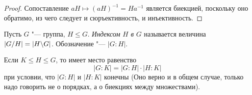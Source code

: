 \begin{proof}
	Сопоставление $aH \mapsto (aH)^{-1} = Ha^{-1}$ является биекцией, поскольку оно обратимо, из чего следует и сюръективность, и инъективность.
\end{proof}

\begin{definition}
	Пусть $G$ "--- группа, $H \le G$. \textit{Индексом $H$ в $G$} называется величина $|G / H| = |H \backslash G|$. Обозначение "--- $|G : H|$.
\end{definition}

\begin{exercise}
	Если $K \le H \le G$, то имеет место равенство
	\[
		|G : K| = |G : H| \cdot |H : K|
	\]
	при условии, что $|G : H|$ и $|H : K|$ конечны (Оно верно и в общем случае, только надо говорить не о порядках, а о биекциях между множествами).
\end{exercise}